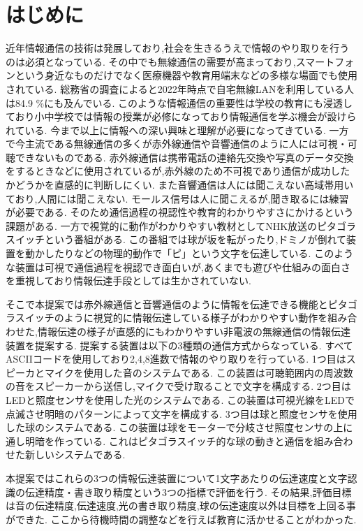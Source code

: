 \section{はじめに}
近年情報通信の技術は発展しており,社会を生きるうえで情報のやり取りを行うのは必須となっている.
その中でも無線通信の需要が高まっており,スマートフォンという身近なものだけでなく医療機器や教育用端末などの多様な場面でも使用されている.
総務省の調査によると2022年時点で自宅無線LANを利用している人は84.9 \%にも及んでいる\cite{soumusyou}.
このような情報通信の重要性は学校の教育にも浸透しており小中学校では情報の授業が必修になっており情報通信を学ぶ機会が設けられている\cite{kyouiku}.
今まで以上に情報への深い興味と理解が必要になってきている.
一方で今主流である無線通信の多くが赤外線通信や音響通信のように人には可視・可聴できないものである.
赤外線通信は携帯電話の連絡先交換や写真のデータ交換をするときなどに使用されているが,赤外線のため不可視であり通信が成功したかどうかを直感的に判断しにくい\cite{sekigaisen}.
また音響通信は人には聞こえない高域帯用いており,人間には聞こえない\cite{onkoyu}.
モールス信号は人に聞こえるが,聞き取るには練習が必要である.
そのため通信過程の視認性や教育的わかりやすさにかけるという課題がある.
一方で視覚的に動作がわかりやすい教材としてNHK放送のピタゴラスイッチという番組がある.
この番組では球が坂を転がったり,ドミノが倒れて装置を動かしたりなどの物理的動作で「ピ」という文字を伝達している\cite{pitagora}.
このような装置は可視で通信過程を視認でき面白いが,あくまでも遊びや仕組みの面白さを重視しており情報伝達手段としては生かされていない.


そこで本提案では赤外線通信と音響通信のように情報を伝達できる機能とピタゴラスイッチのように視覚的に情報伝達している様子がわかりやすい動作を組み合わせた,情報伝達の様子が直感的にもわかりやすい非電波の無線通信の情報伝達装置を提案する.
提案する装置は以下の3種類の通信方式からなっている.
すべてASCIIコードを使用しており2,4,8進数で情報のやり取りを行っている.
1つ目はスピーカとマイクを使用した音のシステムである.
この装置は可聴範囲内の周波数の音をスピーカーから送信し,マイクで受け取ることで文字を構成する.
2つ目はLEDと照度センサを使用した光のシステムである.
この装置は可視光線をLEDで点滅させ明暗のパターンによって文字を構成する.
3つ目は球と照度センサを使用した球のシステムである.
この装置は球をモーターで分岐させ照度センサの上に通し明暗を作っている.
これはピタゴラスイッチ的な球の動きと通信を組み合わせた新しいシステムである.


本提案ではこれらの3つの情報伝達装置について1文字あたりの伝達速度と文字認識の伝達精度・書き取り精度という3つの指標で評価を行う.
その結果,評価目標は音の伝達精度,伝達速度,光の書き取り精度,球の伝達速度以外は目標を上回る事ができた.
ここから待機時間の調整などを行えば教育に活かせることがわかった.
